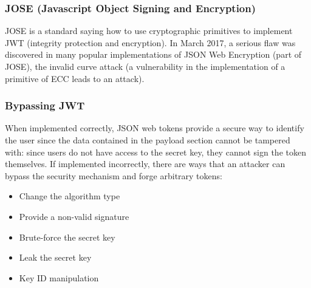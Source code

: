 \documentclass[a4paper, 10pt, titlepage]{article}
\begin{document}
\subsubsection{JOSE (Javascript Object Signing and Encryption)}
JOSE is a standard saying how to use cryptographic primitives to implement JWT (integrity protection and encryption). In March 2017, a serious flaw was discovered in many popular implementations of JSON Web Encryption (part of JOSE), the invalid curve attack (a vulnerability in the implementation of a primitive of ECC leads to an attack).


\subsubsection{Bypassing JWT}
When implemented correctly, JSON web tokens provide a secure way to identify the user since the data contained in the payload section cannot be tampered with: since users do not have access to the secret key, they cannot sign the token themselves.
If implemented incorrectly, there are ways that an attacker can bypass the security mechanism and forge arbitrary tokens:
\begin{itemize}
\item Change the algorithm type
\item Provide a non-valid signature
\item Brute-force the secret key
\item Leak the secret key
\item Key ID manipulation
\end{itemize}
\end{document}
